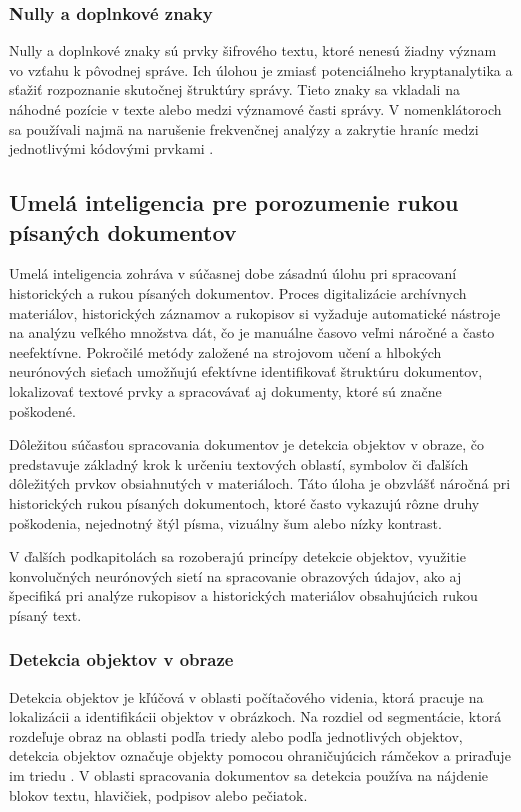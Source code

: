             \subsubsection{Nully a doplnkové znaky}
                Nully a doplnkové znaky sú prvky šifrového textu, ktoré nenesú žiadny význam vo vzťahu k pôvodnej správe. Ich úlohou je zmiasť potenciálneho kryptanalytika a sťažiť rozpoznanie skutočnej štruktúry správy.
                Tieto znaky sa vkladali na náhodné pozície v texte alebo medzi významové časti správy. V nomenklátoroch sa používali najmä na narušenie frekvenčnej analýzy a zakrytie hraníc medzi jednotlivými kódovými prvkami \cite{kahn1996codebreakers}.
                 
    \subsection{Umelá inteligencia pre porozumenie rukou písaných dokumentov}
    Umelá inteligencia zohráva v súčasnej dobe zásadnú úlohu pri spracovaní historických a rukou písaných dokumentov. Proces digitalizácie archívnych materiálov, historických záznamov a rukopisov si vyžaduje automatické nástroje na analýzu veľkého množstva dát, čo je manuálne časovo veľmi náročné a často neefektívne. Pokročilé metódy založené na strojovom učení a hlbokých neurónových sieťach umožňujú efektívne identifikovať štruktúru dokumentov, lokalizovať textové prvky a spracovávať aj dokumenty, ktoré sú značne poškodené.

    Dôležitou súčasťou spracovania dokumentov je detekcia objektov v obraze, čo predstavuje základný krok k určeniu textových oblastí, symbolov či ďalších dôležitých prvkov obsiahnutých v materiáloch. Táto úloha je obzvlášť náročná pri historických rukou písaných dokumentoch, ktoré často vykazujú rôzne druhy poškodenia, nejednotný štýl písma, vizuálny šum alebo nízky kontrast.

    V ďalších podkapitolách sa rozoberajú princípy detekcie objektov, využitie konvolučných neurónových sietí na spracovanie obrazových údajov, ako aj špecifiká pri analýze rukopisov a historických materiálov obsahujúcich rukou písaný text.
        \subsubsection{Detekcia objektov v obraze}
            Detekcia objektov je kľúčová v oblasti počítačového videnia, ktorá pracuje na lokalizácii a identifikácii objektov v obrázkoch. Na rozdiel od segmentácie, ktorá rozdeľuje obraz na oblasti podľa triedy alebo podľa jednotlivých objektov, detekcia objektov označuje objekty pomocou ohraničujúcich rámčekov a priraďuje im triedu \cite{ultralytics_yolo11_detection}. V oblasti spracovania dokumentov sa detekcia používa na nájdenie blokov textu, hlavičiek, podpisov alebo pečiatok.
